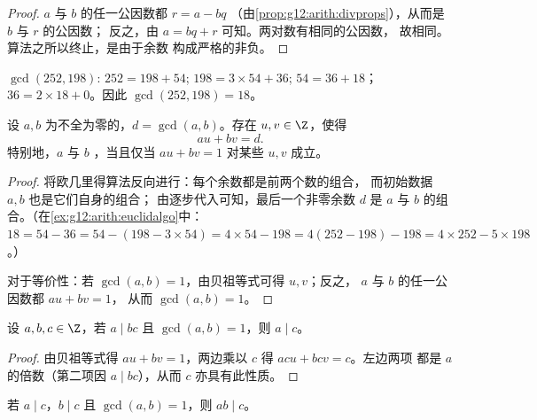 \begin{proof}
$a$ 与 $b$ 的任一公因数都 $r = a - bq$
（由\cref{prop:g12:arith:divprops}），从而是 $b$ 与 $r$ 的公因数；
反之，由 $a = bq + r$ 可知。两对数有相同的公因数，
故相同。算法之所以终止，是由于余数
构成严格的非负。
\end{proof}

\begin{example}\label{ex:g12:arith:euclidalgo}
$\gcd(252, 198)$: $252 = 198 + 54$; $198 = 3\times54 + 36$;
$54 = 36 + 18$；$36 = 2 \times 18 + 0$。因此 $\gcd(252,198) = 18$。
\end{example}

\begin{theorem}[贝祖等式]\label{thm:g12:arith:bezout}
设 $a, b$ 为不全为零的，$d = \gcd(a,b)$。存在
$u, v \in \Z$，使得
\[
au + bv = d .
\]
特别地，$a$ 与 $b$ ，当且仅当 $au + bv = 1$
对某些 $u, v$ 成立。
\end{theorem}

\begin{proof}
将欧几里得算法反向进行：每个余数都是前两个数的组合，
而初始数据 $a, b$ 也是它们自身的组合；
由逐步代入可知，最后一个非零余数 $d$ 是
$a$ 与 $b$ 的组合。（在\cref{ex:g12:arith:euclidalgo}中：
$18 = 54 - 36 = 54 - (198 - 3\times54) = 4\times54 - 198 =
4(252 - 198) - 198 = 4\times252 - 5\times198$。）

对于等价性：若 $\gcd(a,b) = 1$，由贝祖等式可得 $u, v$；反之，
$a$ 与 $b$ 的任一公因数都 $au + bv = 1$，
从而 $\gcd(a,b) = 1$。
\end{proof}

\begin{theorem}[高斯引理]\label{thm:g12:arith:gauss}
设 $a, b, c \in \Z$，若 $a \mid bc$ 且 $\gcd(a, b) = 1$，则 $a \mid c$。
\end{theorem}

\begin{proof}
由贝祖等式得 $au + bv = 1$，两边乘以 $c$ 得 $acu + bcv = c$。左边两项
都是 $a$ 的倍数（第二项因 $a \mid bc$），从而
$c$ 亦具有此性质。
\end{proof}

\begin{corollary}\label{cor:g12:arith:coprimeprod}
若 $a \mid c$，$b \mid c$ 且 $\gcd(a,b) = 1$，则 $ab \mid c$。
\end{corollary}

